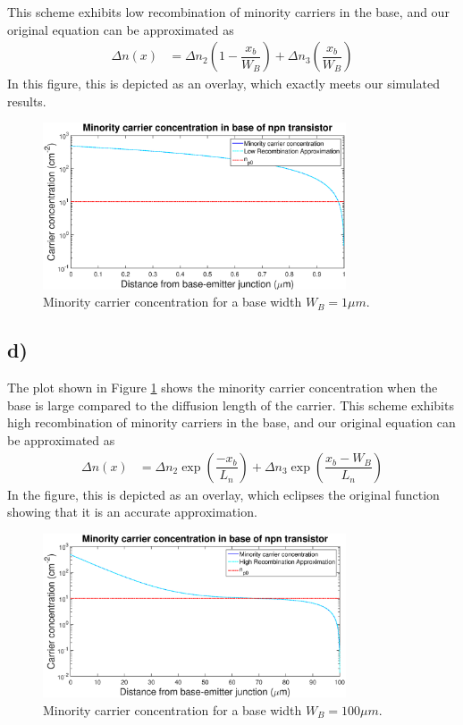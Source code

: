 	This scheme exhibits low recombination of minority carriers in the base, and our original equation can be approximated as
	\[
	\begin{aligned}
		\Delta n(x) &= \Delta n_2 \left(1 - \dfrac{x_b}{W_B}\right) +
		\Delta n_3 \left(\dfrac{x_b}{W_B}\right) 
	\end{aligned}
	\]
	In this figure, this is depicted as an overlay, which exactly meets our simulated results.
	
	\begin{figure}[htbp!]
		\centering
		\includegraphics[width=0.8\textwidth]{./img/3c}
		\caption{Minority carrier concentration for a base width $W_B = 1 \mu m$.}
		\label{fig::3c}
	\end{figure}
\subsection*{d)}
	The plot shown in Figure \ref{fig::3c} shows the minority carrier concentration when the base is large compared to the diffusion length of the carrier. This scheme exhibits high recombination of minority carriers in the base, and our original equation can be approximated as
	\[
	\begin{aligned}
		\Delta n(x) &= \Delta n_2 \exp\left(\dfrac{-x_b}{L_n}\right) +					\Delta n_3 \exp\left(\dfrac{x_b-W_B}{L_n}\right) 
	\end{aligned}
	\]
	In the figure, this is depicted as an overlay, which eclipses the original function showing that it is an accurate approximation.
	\begin{figure}[htbp!]
		\centering
		\includegraphics[width=0.8\textwidth]{./img/3d}
		\caption{Minority carrier concentration for a base width $W_B = 100 \mu m$.}
		\label{fig::3d}
	\end{figure}
